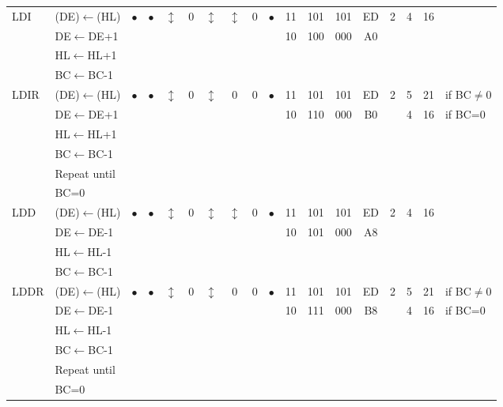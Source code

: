 \documentclass[oneside,a4paper]{book}
\begin{document}
{\begin{tabular}{llcccccccccccccccl}
		LDI\instrt & 
			(DE)$\leftarrow$(HL) & 
			$\bullet$ & 
				$\bullet$ & 
				$\updownarrow$\footnotemark[4] & 
				0 & 
				$\updownarrow$\footnotemark[4] & 
				$\updownarrow$\footnotemark[1] & 
				0 & 
				$\bullet$ & 
			11 & 101 & 101 & 
			ED & 2 & 
			4 & 16 \\ 
		& DE$\leftarrow$DE+1 & \multicolumn{8}{c}{} & 10 & 100 & 000 & A0 & & & \\ 
		& HL$\leftarrow$HL+1 & \\
		& BC$\leftarrow$BC-1 & \\ [4pt]

		LDIR\instrt & 
			(DE)$\leftarrow$(HL) & 
			$\bullet$ & 
				$\bullet$ &
				$\updownarrow$\footnotemark[4] & 
				0 & 
				$\updownarrow$\footnotemark[4] & 
				0\footnotemark[2] & 
				0 & 
				$\bullet$ & 
			11 & 101 & 101 & 
			ED & 2 & 
			5 & 21 & {if BC$\not=$0} \\
		& DE$\leftarrow$DE+1 & \multicolumn{8}{c}{} & 10 & 110 & 000 & B0 & & 4 & 16 & {if BC=0} \\
		& HL$\leftarrow$HL+1 & \\
		& BC$\leftarrow$BC-1 & \\ 
		& Repeat until & \\ 
		& BC=0 & \instrb \\

		LDD\instrt & 
			(DE)$\leftarrow$(HL) & 
			$\bullet$ & 
				$\bullet$ & 
				$\updownarrow$\footnotemark[4] & 
				0 & 
				$\updownarrow$\footnotemark[4] & 
				$\updownarrow$\footnotemark[1] & 
				0 & 
				$\bullet$ & 
			11 & 101 & 101 & 
			ED & 2 & 
			4 & 16 & \\ 
		& DE$\leftarrow$DE-1 & \multicolumn{8}{c}{} & 10 & 101 & 000 & A8 & & \\ 
		& HL$\leftarrow$HL-1 & \\
		& BC$\leftarrow$BC-1 & \instrb \\

		LDDR\instrt & 
			(DE)$\leftarrow$(HL) & 
			$\bullet$ & 
				$\bullet$ & 
				$\updownarrow$\footnotemark[4] & 
				0 & 
				$\updownarrow$\footnotemark[4] & 
				0\footnotemark[2] & 
				0 & 
				$\bullet$ & 
			11 & 101 & 101 & 
			ED & 2 & 
			5 & 21 & {if BC$\not=$0} \\ 
		& DE$\leftarrow$DE-1 & \multicolumn{8}{c}{} & 10 & 111 & 000 & B8 & & 4 & 16 & {if BC=0} \\
		& HL$\leftarrow$HL-1 & \\
		& BC$\leftarrow$BC-1 & \\ 
		& Repeat until & \\ 
		& BC=0 & \instrb \\


\end{tabular}}
\end{document}
